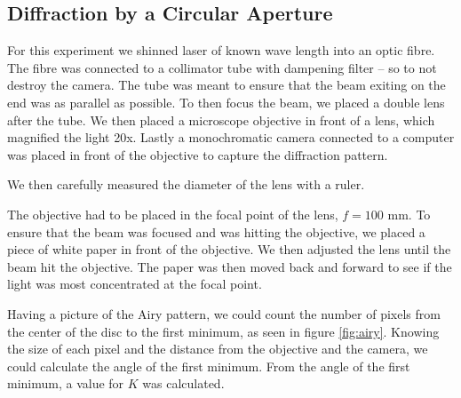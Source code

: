 \documentclass{emulateapj}
\begin{document}
\subsection{Diffraction by a Circular Aperture}
For this experiment we shinned laser of known wave length into an optic fibre. The fibre was connected to a collimator tube with dampening filter -- so to not destroy the camera. The tube was meant to ensure that the beam exiting on the end was as parallel as possible. To then focus the beam, we placed a double lens after the tube. We then placed a microscope objective in front of a lens, which magnified the light 20x. Lastly a monochromatic camera connected to a computer was placed in front of the objective to capture the diffraction pattern.

We then carefully measured the diameter of the lens with a ruler.

The objective had to be placed in the focal point of the lens, $f = 100$ mm. To ensure that the beam was focused and was hitting the objective, we placed a piece of white paper in front of the objective. We then adjusted the lens until the beam hit the objective. The paper was then moved back and forward to see if the light was most concentrated at the focal point. 

Having a picture of the Airy pattern, we could count the number of pixels from the center of the disc to the first minimum, as seen in figure \ref{fig:airy}. Knowing the size of each pixel and the distance from the objective and the camera, we could calculate the angle of the first minimum. From the angle of the first minimum, a value for $K$ was calculated.
\end{document}
